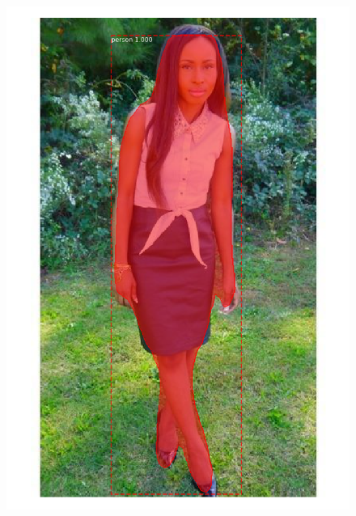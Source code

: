 \documentclass[12pt]{report}
\begin{document}
\begin{figure}
\begin{minipage}[b]{0.3\textwidth}
    \includegraphics[width=\textwidth]{images/resultados/1082993person.png}
    \caption{}
  \end{minipage}
    \hfill
  \begin{minipage}[b]{0.3\textwidth}

\end{minipage}
\end{figure}
\end{document}
